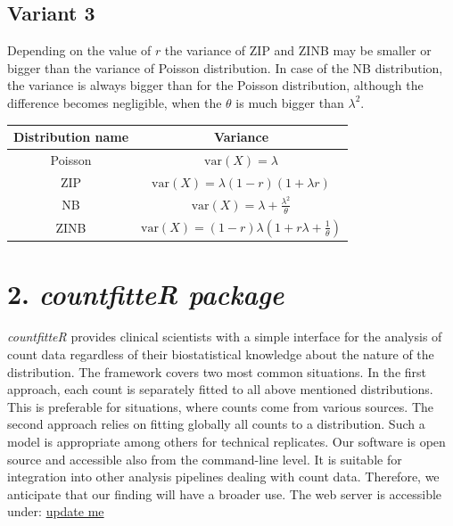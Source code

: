 \subsection{Variant 3}

Depending on the value of $r$ the variance of ZIP and ZINB may be smaller or bigger than the variance of Poisson distribution. In case of the NB distribution, the variance is always bigger than for the Poisson distribution, although the difference becomes negligible, when the $\theta$ is much bigger than $\lambda^2$.

\begin{center}
\begin{tabular}{ |c|c| } 
\hline
\bfseries Distribution name & \bfseries Variance \\
\hline
Poisson & $\textrm{var}(X) = \lambda $ \\
\hline
ZIP & $\textrm{var}(X) = \lambda (1 - r)(1 + \lambda r)$ \\
\hline
NB & $\textrm{var}(X) = \lambda + \frac{\lambda^2}{\theta} $ \\
\hline
ZINB & $\textrm{var}(X) = (1 - r) \lambda \left( 1 + r\lambda  + \frac{1}{\theta} \right)$ \\
\hline
\end{tabular}
\end{center}


\section{2. \emph{countfitteR package}}


\emph{countfitteR} provides clinical scientists with a simple interface for the analysis of count data regardless of their biostatistical knowledge about the nature of the distribution. The framework covers two most common situations. In the first approach, each count is separately fitted to all above mentioned distributions. This is preferable for situations, where counts come from various sources. The second approach relies on fitting globally all counts to a distribution. Such a model is appropriate among others for technical replicates.
Our software is open source and accessible also from the command-line level. It is suitable for integration into other analysis pipelines dealing with count data. Therefore, we anticipate that our finding will have a broader use. 
The web server is accessible under: 
\url{update me}

